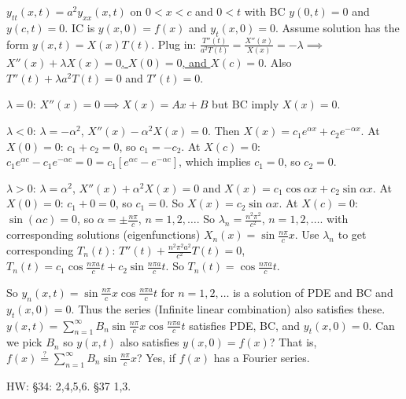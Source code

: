 \documentclass[]{article}
\begin{document}
\begin{example}
	 $y_{tt}(x,t) = a^2 y_{xx}(x,t)$ on $0<x<c$ and $0<t$ with BC $y(0,t)=0$ and $y(c,t)=0$. IC is $y(x,0)=f(x)$ and $y_t(x,0)=0$.
	Assume solution has the form $y(x,t)=X(x)T(t)$. Plug in: $\frac{T''(t)}{a^2T(t)}=\frac{X''(x)}{X(x)} = -\lambda \implies$\underline{$X''(x)+\lambda X(x)=0$, $X(0)=0$, and $X(c)=0$}. Also $T''(t)+\lambda a^2 T(t)=0$ and $T'(t)=0$.
	
	\underline{$\lambda=0$}: $X''(x)=0 \implies X(x)=Ax+B$ but BC imply $X(x)=0$.
	
	\underline{$\lambda<0$}: $\lambda=-\alpha^2$, $X''(x)-\alpha^2 X(x)=0$. Then $X(x) = c_1e^{\alpha x} + c_2 e^{-\alpha x}$. At $X(0)=0$: $c_1+c_2=0$, so $c_1=-c_2$. At $X(c)=0$: $c_1e^{\alpha c} - c_1e^{-\alpha c} = 0 = c_1 \left[ e^{\alpha c} - e^{-\alpha c}\right]$, which implies $c_1 = 0$, so $c_2=0$.
	
	\underline{$\lambda>0$}: $\lambda = \alpha^2$, $X''(x) + \alpha^2 X(x) = 0$ and $X(x) = c_1 \cos{\alpha x} + c_2 \sin{\alpha x}$. At $X(0)=0$: $c_1+0=0$, so $c_1=0$. So $X(x) = c_2\sin{\alpha x}$. At $X(c)=0$: $\sin{(\alpha c)} = 0$, so $\alpha = \pm\frac{n\pi}{c}$, $n=1,2,\dots$.
	So $\lambda_n = \frac{n^2\pi^2}{c^2}$, $n=1,2,\dots$. with corresponding solutions (eigenfunctions) $X_n(x) = \sin{\frac{n\pi}{c}x}$.
	Use $\lambda_n$ to get corresponding $T_n(t)$: $T''(t) + \frac{n^2\pi^2a^2}{c^2}T(t) = 0$, $T_n(t) = c_1\cos{\frac{n\pi a}{c}t} + c_2\sin{\frac{n\pi a}{c}t}$. So $T_n(t) = \cos{\frac{n\pi a}{c}t}$.
	
	So $y_n(x,t) = \sin{\frac{n\pi}{c}x} \cos{\frac{n\pi a}{c} t}$ for $n=1,2,\dots$ is a solution of PDE and BC and $y_t(x,0)=0$.
	Thus the series (Infinite linear combination) also satisfies these.
	$y(x,t) = \sum_{n=1}^\infty B_n \sin{\frac{n\pi}{c}x}\cos{\frac{n\pi a}{c}t}$ satisfies PDE, BC, and $y_t(x,0)=0$.
	Can we pick $B_n$ so $y(x,t)$ also satisfies $y(x,0) = f(x)$?
	That is, $f(x) \stackrel{?}{=} \sum_{n=1}^\infty B_n \sin{\frac{n\pi}{c}x}$?
	Yes, if $f(x)$ has a Fourier series.
\end{example}
HW: \S34: 2,4,5,6. \S37 1,3.
\end{document}
